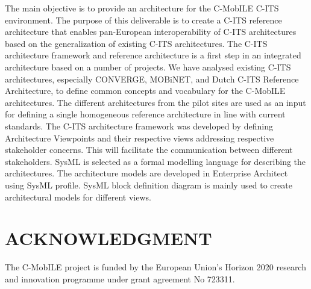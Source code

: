 \documentclass[letterpaper, 10 pt, conference]{ieeeconf}  %
\begin{document}
The main objective is to provide an architecture for the C-MobILE C-ITS environment. The purpose of this deliverable is to create a C-ITS reference architecture that enables pan-European interoperability of C-ITS architectures based on the generalization of existing C-ITS architectures. The C-ITS architecture framework and reference architecture is a first step in an integrated architecture based on a number of projects. We have analysed existing C-ITS architectures, especially CONVERGE, MOBiNET, and Dutch C-ITS Reference Architecture, to define common concepts and vocabulary for the C-MobILE architectures. The different architectures from the pilot sites are used as an input for defining a single homogeneous reference architecture in line with current standards.
The C-ITS architecture framework was developed by defining Architecture Viewpoints and their respective views addressing respective stakeholder concerns. This will facilitate the communication between different stakeholders. SysML is selected as a formal modelling language for describing the architectures. The architecture models are developed in Enterprise Architect using SysML profile. SysML block definition diagram is mainly used to create architectural models for different views.


\addtolength{\textheight}{-12cm}   %




\section*{ACKNOWLEDGMENT}

The C-MobILE project is funded by the European Union's Horizon 2020 research and innovation programme under grant agreement No 723311.


\end{document}
